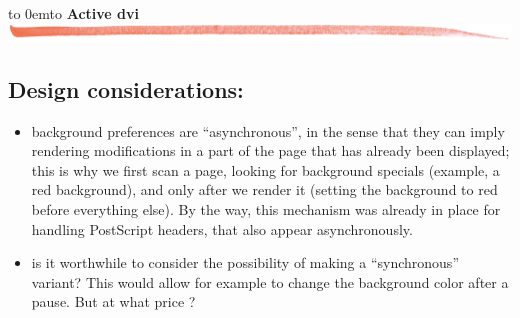 \documentclass[12pt]{article}
\def\keymenu#1{\textcolor{red}{\underline{#1}}}
\def\advifooter{\vbox to 0em{\vbox to \vsize {\vfill
Press: \keymenu{n}ext page \keymenu{p}revious page
\keymenu{\textvisiblespace} next pause%
\hfill{\embedsticky{advianim}{1.56cm}{1.824cm}{animate -geometry !g! -window !p advilogo.anim.gif}}
} \vss}}
\def\adviheader{\noindent
{\bf\Large Active dvi}\\
\includegraphics[width=\textwidth]{../tex/bar.jpg.eps}}
\let \Newpage \newpage
\def \newpage {\Newpage \advifooter\adviheader}
\def\adviemptyfooter{\vbox to 0em{\vbox to \vsize {\vfill
~~\vss\killembed{advianim}}}}
\def\lastpage{\Newpage\adviemptyfooter\adviheader}
\begin{document}
\lastpage


\subsection* {Design considerations:}

  \begin{itemize}
    \item background preferences are ``asynchronous'', in the sense
that they can imply rendering modifications in a part of the page that
has already been displayed; this is why we first scan a page, looking
for background specials (example, a red background), and only after we
render it (setting the background to red before everything else). By
the way, this mechanism was already in place for handling PostScript
headers, that also appear asynchronously.
    \item is it worthwhile to consider the possibility of making a
``synchronous'' variant? This would allow for example to change the
background color after a pause. But at what price ?
  \end{itemize}
\end{document}

